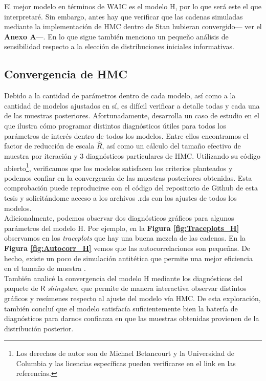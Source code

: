 El mejor modelo en términos de WAIC es el modelo H, por lo que será este el que interpretaré. Sin embargo, antes hay que verificar que las cadenas simuladas mediante la implementación de HMC dentro de Stan hubieran convergido--- ver el \textbf{Anexo A}---. En lo que sigue también menciono un pequeño análisis de sensibilidad respecto a la elección de distribuciones iniciales informativas.

\subsection{Convergencia de HMC}

Debido a la cantidad de parámetros dentro de cada modelo, así como a la cantidad de modelos ajustados en sí, es difícil verificar a detalle todas y cada una de las muestras posteriores. Afortunadamente, \textcite{BetancourtRStanWorkflow} desarrolla un caso de estudio en el que ilustra cómo programar distintos diagnósticos útiles para todos los parámetros de interés dentro de todos los modelos. Entre ellos encontramos el factor de reducción de escala $\hat{R}$, así como un cálculo del tamaño efectivo de muestra por iteración y 3 diagnósticos particulares de HMC. Utilizando su código abierto\footnote{Los derechos de autor son de Michael Betancourt y la Universidad de Columbia y las licencias específicas pueden verificarse en el link en las referencias.}, verificamos que los modelos satisfacen los criterios planteados y podemos confiar en la convergencia de las muestras posteriores obtenidas. Esta comprobación puede reproducirse con el código del repositorio de Github de esta tesis y solicitándome acceso a los archivos .rds con los ajustes de todos los modelos.\\

 Adicionalmente, podemos observar dos diagnósticos gráficos para algunos parámetros del modelo H. Por ejemplo, en la \textbf{Figura \ref{fig:Traceplots_H}} observamos en los \textit{traceplots} que hay una buena mezcla de las cadenas. En la \textbf{Figura \ref{fig:Autocorr_H}} vemos que las autocorrelaciones son pequeñas. De hecho, existe un poco de simulación antitética que permite una mejor eficiencia en el tamaño de muestra \parencite{BlogAntithetical}.\\ 
 
 También analicé la convergencia del modelo H mediante los diagnósticos del paquete de $\mathsf{R}$ \textit{shinystan}, que permite de manera interactiva observar distintos gráficos y resúmenes respecto al ajuste del modelo vía HMC. De esta exploración, también concluí que el modelo satisfacía suficientemente bien la batería de diagnósticos para darnos confianza en que las muestras obtenidas provienen de la distribución posterior.\\
 
